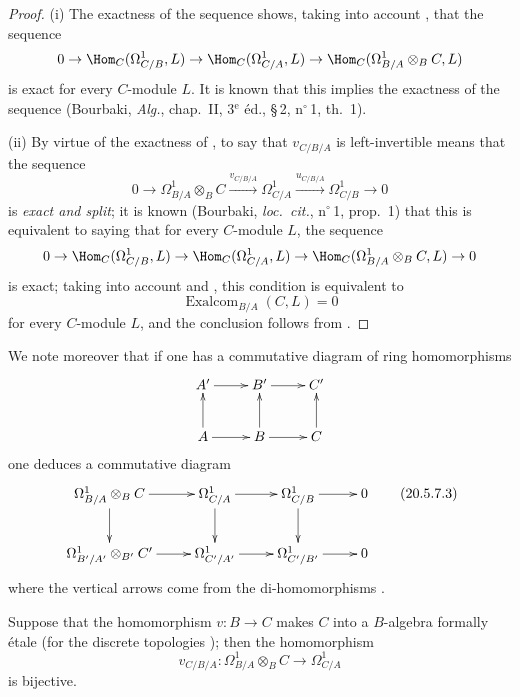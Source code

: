 \begin{proof}
(i) The exactness of the sequence  shows, taking into account , that the sequence
\[
  0\to\Hom_C(\Omega^1_{C/B},L)\to\Hom_C(\Omega^1_{C/A},L)\to\Hom_C(\Omega^1_{B/A}\otimes_B C,L)
\]
is exact for every $C$-module $L$.
It is known that this implies the exactness of the sequence  (Bourbaki, \emph{Alg.}, chap.~II, 3$^\text{e}$ \'{e}d., \S\,2, n$^\circ$\,1, th.~1).

\medskip
(ii) By virtue of the exactness of , to say that $v_{C/B/A}$ is left-invertible means that the sequence
\begin{equation}
\tag{20.5.7.2}
  \label{0.20.5.7.2}
  0\to\Omega^1_{B/A}\otimes_B C\xrightarrow{v_{C/B/A}}\Omega^1_{C/A}\xrightarrow{u_{C/B/A}}\Omega^1_{C/B}\to 0
\end{equation}
is \emph{exact and split}; it is known (Bourbaki, \emph{loc.\ cit.}, n$^\circ$\,1, prop.~1) that this is equivalent to saying that for every $C$-module $L$, the sequence
\[
  0\to\Hom_C(\Omega^1_{C/B},L)\to\Hom_C(\Omega^1_{C/A},L)\to\Hom_C(\Omega^1_{B/A}\otimes_B C,L)\to 0
\]
is exact; taking into account  and , this condition is equivalent to
\[
  \operatorname{Exalcom}_{B/A}(C,L)=0
\]
for every $C$-module $L$, and the conclusion follows from .
\end{proof}

We note moreover that if one has a commutative diagram of ring homomorphisms
\[
\xymatrix{
  A' \ar[r] & B' \ar[r] & C' \\
  A \ar[u] \ar[r] & B \ar[u] \ar[r] & C \ar[u]
}
\]
one deduces a commutative diagram
\[
\xymatrix{
  \Omega^1_{B/A}\otimes_B C \ar[r] \ar[d] & \Omega^1_{C/A} \ar[r] \ar[d] & \Omega^1_{C/B} \ar[r] \ar[d] & 0 \\
  \Omega^1_{B'/A'}\otimes_{B'} C' \ar[r] & \Omega^1_{C'/A'} \ar[r] & \Omega^1_{C'/B'} \ar[r] & 0
}
\tag{20.5.7.3}
  \label{0.20.5.7.3}
\]
where the vertical arrows come from the di-homomorphisms .

\begin{corollary}[20.5.8]
\label{0.20.5.8}
Suppose that the homomorphism $v:B\to C$ makes $C$ into a $B$-algebra formally \'{e}tale \textup{(}for the discrete topologies \textup{)}; then the homomorphism 
\[
  v_{C/B/A}:\Omega^1_{B/A}\otimes_B C\to\Omega^1_{C/A}
\]
is bijective.
\end{corollary}

